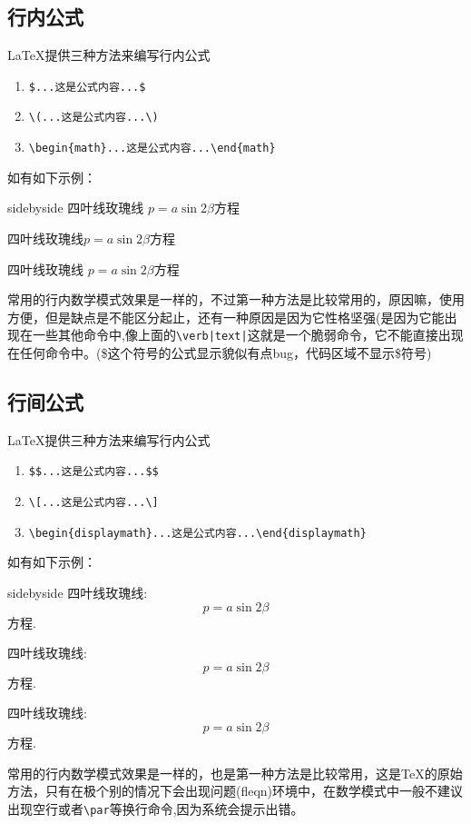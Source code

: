 \documentclass[cn,chinese,color=cyan]{elegantbook}
\begin{document}
\subsection{行内公式}
LaTeX提供三种方法来编写行内公式
\begin{enumerate}
	\item \verb|$...这是公式内容...$|
	\item  \verb|\(...这是公式内容...\)|
	\item  \verb|\begin{math}...这是公式内容...\end{math}|
\end{enumerate}
如有如下示例：
\begin{tcblisting}{sidebyside}
四叶线玫瑰线 $p=a\sin2\beta$方程 

四叶线玫瑰线\(p=a\sin2\beta\)方程 

四叶线玫瑰线
\begin{math}p=a\sin2\beta\end{math}方程
\end{tcblisting}
\begin{note}
	常用的行内数学模式效果是一样的，不过第一种方法是比较常用的，原因嘛，使用方便，但是缺点是不能区分起止，还有一种原因是因为它性格坚强(是因为它能出现在一些其他命令中,像上面的\verb+\verb|text|+这就是一个脆弱命令，它不能直接出现在任何命令中。(\$这个符号的公式显示貌似有点bug，代码区域不显示\$符号)
\end{note}

\subsection{行间公式}
LaTeX提供三种方法来编写行内公式
\begin{enumerate}
\item \verb|$$...这是公式内容...$$|
\item  \verb|\[...这是公式内容...\]|
\item  \verb|\begin{displaymath}...这是公式内容...\end{displaymath}|
\end{enumerate}
如有如下示例：
\begin{tcblisting}{sidebyside}
四叶线玫瑰线:$$p=a\sin2\beta$$方程.

四叶线玫瑰线:\[p=a\sin2\beta\]方程. 

四叶线玫瑰线:
\begin{displaymath}
p=a\sin2\beta
\end{displaymath}
方程.
\end{tcblisting}
\begin{note}
	常用的行内数学模式效果是一样的，也是第一种方法是比较常用，这是\TeX 的原始方法，只有在极个别的情况下会出现问题(fleqn)环境中，在数学模式中一般不建议出现空行或者\verb|\par|等换行命令,因为系统会提示出错。
\end{note}
\end{document}
